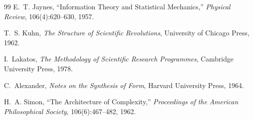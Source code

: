 \documentclass[12pt,a4paper]{article}
\begin{document}
\begin{thebibliography}{99}
E.~T. Jaynes, ``Information Theory and Statistical Mechanics,'' \textit{Physical Review}, 106(4):620--630, 1957.

T.~S. Kuhn, \textit{The Structure of Scientific Revolutions}, University of Chicago Press, 1962.

I.~Lakatos, \textit{The Methodology of Scientific Research Programmes}, Cambridge University Press, 1978.

C.~Alexander, \textit{Notes on the Synthesis of Form}, Harvard University Press, 1964.

H.~A. Simon, ``The Architecture of Complexity,'' \textit{Proceedings of the American Philosophical Society}, 106(6):467--482, 1962.

\end{thebibliography}
\end{document}
